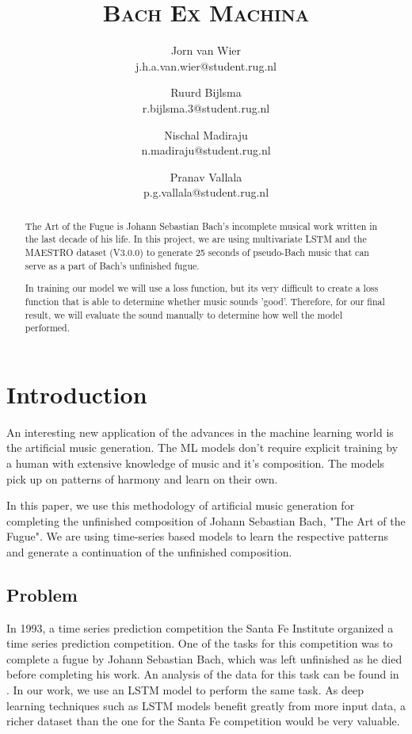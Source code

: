\documentclass[11pt, twocolumn]{article}
\title{\vspace{1.5cm}\textbf{\scshape{Bach Ex Machina}}}
\author{
    Jorn van Wier\\
    \small j.h.a.van.wier@student.rug.nl
    
    \and 
    
    Ruurd Bijlsma\\
    \small r.bijlsma.3@student.rug.nl
    
    \and 
    
    Nischal Madiraju\\
    \small n.madiraju@student.rug.nl
    
    \and 
    
    Pranav Vallala\\
    \small p.g.vallala@student.rug.nl
}
\date{}
\begin{document}

\maketitle

\thispagestyle{firstpage}

\begin{abstract}
\noindent
The Art of the Fugue is Johann Sebastian Bach's incomplete musical work written in the last decade of his life. In this project, we are using multivariate LSTM and the MAESTRO dataset (V3.0.0) to generate 25 seconds of pseudo-Bach music that can serve as a part of Bach's unfinished fugue. 

In training our model we will use a loss function, but its very difficult to create a loss function that is able to determine whether music sounds 'good'. Therefore, for our final result, we will evaluate the sound manually to determine how well the model performed.

\end{abstract}
\section{Introduction}
An interesting new application of the advances in the machine learning world is the artificial music generation. The ML models don't require explicit training by a human with extensive knowledge of music and it's composition. The models pick up on patterns of harmony and learn on their own. 

In this paper, we use this methodology of artificial music generation for completing the unfinished composition of Johann Sebastian Bach, "The Art of the Fugue". We are using time-series based models to learn the respective patterns and generate a continuation of the unfinished composition. 
\subsection{Problem}
In 1993, a time series prediction competition the Santa Fe Institute organized a time series prediction competition. One of the tasks for this competition was to complete a fugue by Johann Sebastian Bach, which was left unfinished as he died before completing his work. 
An analysis of the data for this task can be found in \cite{dirstt1993baroque}. In our work, we use an LSTM model to perform the same task. As deep learning techniques such as LSTM models benefit greatly from more input data, a richer dataset than the one for the Santa Fe competition would be very valuable.
\end{document}
